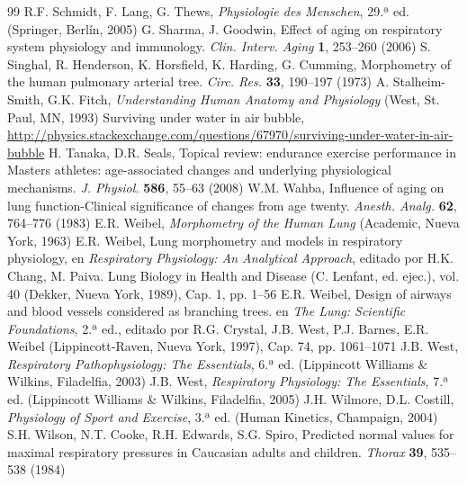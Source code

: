 \documentclass[12pt]{book}
\begin{document}
\begin{thebibliography}{99}
 R.F. Schmidt, F. Lang, G. Thews, \textit{Physiologie des Menschen}, 29.ª ed. (Springer, Berlín, 2005)
 G. Sharma, J. Goodwin, Effect of aging on respiratory system physiology and immunology. \textit{Clin. Interv. Aging} \textbf{1}, 253--260 (2006)
 S. Singhal, R. Henderson, K. Horsfield, K. Harding, G. Cumming, Morphometry of the human pulmonary arterial tree. \textit{Circ. Res.} \textbf{33}, 190--197 (1973)
 A. Stalheim-Smith, G.K. Fitch, \textit{Understanding Human Anatomy and Physiology} (West, St. Paul, MN, 1993)
 Surviving under water in air bubble, \url{http://physics.stackexchange.com/questions/67970/surviving-under-water-in-air-bubble}
 H. Tanaka, D.R. Seals, Topical review: endurance exercise performance in Masters athletes: age-associated changes and underlying physiological mechanisms. \textit{J. Physiol.} \textbf{586}, 55--63 (2008)
 W.M. Wahba, Influence of aging on lung function-Clinical significance of changes from age twenty. \textit{Anesth. Analg.} \textbf{62}, 764--776 (1983)
 E.R. Weibel, \textit{Morphometry of the Human Lung} (Academic, Nueva York, 1963)
 E.R. Weibel, Lung morphometry and models in respiratory physiology, en \textit{Respiratory Physiology: An Analytical Approach}, editado por H.K. Chang, M. Paiva. Lung Biology in Health and Disease (C. Lenfant, ed. ejec.), vol. 40 (Dekker, Nueva York, 1989), Cap. 1, pp. 1--56
 E.R. Weibel, Design of airways and blood vessels considered as branching trees. en \textit{The Lung: Scientific Foundations}, 2.ª ed., editado por R.G. Crystal, J.B. West, P.J. Barnes, E.R. Weibel (Lippincott-Raven, Nueva York, 1997), Cap. 74, pp. 1061--1071
 J.B. West, \textit{Respiratory Pathophysiology: The Essentials}, 6.ª ed. (Lippincott Williams \& Wilkins, Filadelfia, 2003)
 J.B. West, \textit{Respiratory Physiology: The Essentials}, 7.ª ed. (Lippincott Williams \& Wilkins, Filadelfia, 2005)
 J.H. Wilmore, D.L. Costill, \textit{Physiology of Sport and Exercise}, 3.ª ed. (Human Kinetics, Champaign, 2004)
 S.H. Wilson, N.T. Cooke, R.H. Edwards, S.G. Spiro, Predicted normal values for maximal respiratory pressures in Caucasian adults and children. \textit{Thorax} \textbf{39}, 535--538 (1984)
\end{thebibliography}

\end{document}
